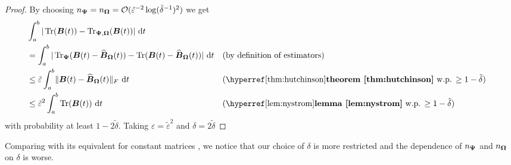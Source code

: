 \documentclass[12pt]{article}
\begin{document}
\begin{proof}
    By choosing $n_{\boldsymbol{\Psi}} = n_{\boldsymbol{\Omega}} = \mathcal{O}(\tilde{\varepsilon}^{-2} \log(\tilde{\delta}^{-1})^2)$ we get
    \begin{align}
        &\int_{a}^{b} | \Trace(\mtx{B}(t)) - \Nystrpp{\mtx{\Omega}}{\mtx{\Psi}}(\mtx{B}(t)) |~\mathrm{d}t \notag \\
        &= \int_{a}^{b} | \Hutch{\mtx{\Psi}}(\mtx{B}(t) - \Nystr{\mtx{\Omega}}{\mtx{B}}(t)) - \Trace(\mtx{B}(t) - \Nystr{\mtx{\Omega}}{\mtx{B}}(t)) |~\mathrm{d}t && \text{(by definition of estimators)} \notag \\
        &\leq \tilde{\varepsilon} \int_{a}^{b} \lVert \mtx{B}(t) - \Nystr{\mtx{\Omega}}{\mtx{B}}(t) \rVert _F ~\mathrm{d}t && \text{(\refthm{thm:hutchinson} w.p. $\geq 1 - \tilde{\delta}$)} \notag \\
        &\leq \tilde{\varepsilon}^2 \int_{a}^{b} \Trace(\mtx{B}(t)) ~\mathrm{d}t && \text{(\reflem{lem:nystrom} w.p. $\geq 1 - \tilde{\delta}$)} 
    \end{align}
    with probability at least $1 - 2\tilde{\delta}$. Taking $\varepsilon = \tilde{\varepsilon}^2$ and $\delta = 2 \tilde{\delta}$
\end{proof}

Comparing  with its equivalent for constant matrices \cite[theorem 3.4]{persson-2022-improved-variants}, we notice that our choice of $\delta$ is more restricted and the dependence of $n_{\boldsymbol{\Psi}}$ and $n_{\boldsymbol{\Omega}}$ on $\delta$ is worse.

\end{document}
